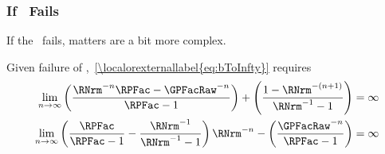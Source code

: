 \documentclass[\econtexRoot/BufferStockTheory]{subfiles}
\begin{document}

\subsubsection{If \FHWC~Fails}
If the \FHWC~fails, matters are a bit more complex.

\begin{comment}
  As noted in the main text, the Finite Value Requirement for such a consumer
  requires $\GPFacRaw < (\Rfree/\PermGroFac)^{1/\CRRA}$,\footnote{A
    unique well-defined nondegenerate limiting consumption function can
    actually exist even if a nondegenerate value function does not.  But
    the parametric combinations required for this are somewhat peculiar
    (including both $\Rfree < 1$ and $\PermGroFac < 1$); but we restrict our attention
    to the more useful and plausible cases with finite value.} which is stronger (holds
  in strictly fewer circumstances) than the \GICRaw~condition $\GPFacRaw < 1$.
  Thus, the \GICRaw~is an implication of $\cncl{\FHWC}$.
\end{comment}

Given failure of \FHWC,~\eqref{\localorexternallabel{eq:bToInfty}} requires
\begin{equation}\begin{gathered}\begin{aligned}
  \lim_{n \rightarrow \infty} \left(\frac{\RNrm^{-n}\RPFac-\GPFacRaw^{-n}}{\RPFac-1}\right) + \left(\frac{1-\RNrm^{-(n+1)}}{\RNrm^{-1}-1}\right)  & = \infty \notag
  \\   \lim_{n \rightarrow \infty} \left(\frac{\RPFac}{\RPFac-1}-\frac{\RNrm^{-1}}{\RNrm^{-1}-1}\right)\RNrm^{-n}-\left(\frac{\GPFacRaw^{-n}}{\RPFac-1}\right)  & = \infty \label{eq:FHWCfails} 
\end{aligned}\end{gathered}\end{equation}
\hypertarget{PFGICHoldsFHWCFailsRICFailsDiscuss}{}
\end{document}

